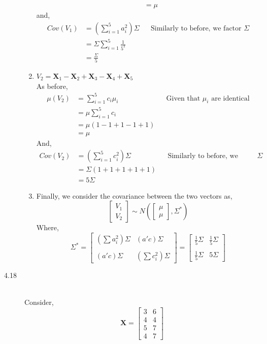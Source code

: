 \documentclass[letterpaper,10pt]{article}
\begin{document}
\begin{description}
\begin{enumerate}[label=\alph*.]
\begin{align*}
&=\mu
\end{align*}
and,
\begin{align*}
Cov(V_1) &= \left(\sum_{i=1}^{5}a_i^2\right)\Sigma && \text{Similarly to before, we factor }\Sigma\\
&=\Sigma \sum_{i=1}^5\frac{1}{5^2}\\
&=\frac{\Sigma}{5}
\end{align*}
\item $V_2=\textbf{X}_1-\textbf{X}_2+\textbf{X}_3-\textbf{X}_4+\textbf{X}_5$\\
As before,
\begin{align*}
\mu(V_2) &=\sum_{i=1}^5c_i\mu_i && \text{Given that }\mu_i\text{ are identical}\\
&=\mu\sum_{i=1}^5c_i\\
&=\mu(1-1+1-1+1)\\
&=\mu
\end{align*}
And,
\begin{align*}
Cov(V_2) &= \left(\sum_{i=1}^5c_i^2\right)\Sigma && \text{Similarly to before, we factor }\Sigma\\
&=\Sigma(1+1+1+1+1)\\
&=5\Sigma
\end{align*}
\item Finally, we consider the covariance between the two vectors as,
\[\begin{bmatrix}
V_1\\V_2
\end{bmatrix}\sim N\left(\begin{bmatrix}
\mu \\ \mu
\end{bmatrix}, \Sigma^*\right) \]
Where,
\[\Sigma^*=\begin{bmatrix}
(\sum a_i^2)\Sigma & (a'c)\Sigma\\\\
(a'c)\Sigma & (\sum c_i^2)\Sigma
\end{bmatrix}=\begin{bmatrix}
\frac{1}{5}\Sigma & \frac{1}{5}\Sigma\\\\
\frac{1}{5}\Sigma & 5\Sigma
\end{bmatrix} \]
\end{enumerate}
\item[4.18]\hfill\\
Consider,
\[\textbf{X}=\begin{bmatrix}
3 & 6\\4 & 4\\5 & 7\\4 & 7

\end{bmatrix}\]
\end{description}
\end{document}
